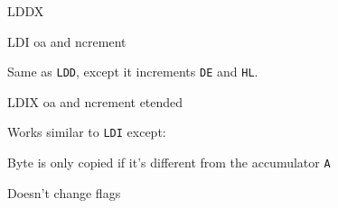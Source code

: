 \begin{basedescript}{
	\desclabelstyle{\multilinelabel}
	\desclabelwidth{3cm}}
\begin{DetailItem}{LDDX}{\DetailItemZXN}
	\end{DetailItem}


	\begin{DetailItem}{LDI}{}
		{oa and ncrement}		
		{\SymLDI}

		Same as {\tt LDD}, except it increments {\tt DE} and {\tt HL}.

		\begin{DetailEffects}
			\FlagsLDI
		\end{DetailEffects}

		\begin{DetailEffectsFlags}
		\end{DetailEffectsFlags}

		\begin{DetailTiming}
		\end{DetailTiming}

	\end{DetailItem}


	\begin{DetailItem}{LDIX}{\DetailItemZXN}
		{oa and ncrement etended}		
		{\SymLDIX}

		Works similar to {\tt LDI} except:
		\begin{DetailCompactList}
			\item Byte is only copied if it's different from the accumulator {\tt A}
			\item Doesn't change flags
		\end{DetailCompactList}


\end{DetailItem}
\end{basedescript}
